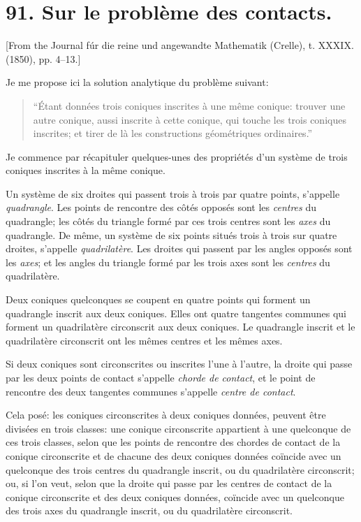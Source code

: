 \documentclass[12pt,a4paper]{article}
\theoremstyle{definition}
\begin{document}
\newpage


\section*{91. Sur le probl\`{e}me des contacts.}

[From the Journal f\'{u}r die reine und angewandte Mathematik (Crelle), t. XXXIX. (1850), pp. 4--13.]

Je me propose ici la solution analytique du probl\`{e}me suivant:
\begin{quote}
``\'{E}tant donn\'{e}es trois coniques inscrites \`{a} une m\^{e}me conique: trouver une autre conique, aussi inscrite \`{a} cette conique, qui touche les trois coniques inscrites; et tirer de l\`{a} les constructions g\'{e}om\'{e}triques ordinaires.''
\end{quote}

Je commence par r\'{e}capituler quelques-unes des propri\'{e}t\'{e}s d'un syst\`{e}me de trois coniques inscrites \`{a} la m\^{e}me conique.

Un syst\`{e}me de six droites qui passent trois \`{a} trois par quatre points, s'appelle \emph{quadrangle}. Les points de rencontre des c\^{o}t\'{e}s oppos\'{e}s sont les \emph{centres} du quadrangle; les c\^{o}t\'{e}s du triangle form\'{e} par ces trois centres sont les \emph{axes} du quadrangle. De m\^{e}me, un syst\`{e}me de six points situ\'{e}s trois \`{a} trois sur quatre droites, s'appelle \emph{quadrilat\`{e}re}. Les droites qui passent par les angles oppos\'{e}s sont les \emph{axes}; et les angles du triangle form\'{e} par les trois axes sont les \emph{centres} du quadrilat\`{e}re.

Deux coniques quelconques se coupent en quatre points qui forment un quadrangle inscrit aux deux coniques. Elles ont quatre tangentes communes qui forment un quadrilat\`{e}re circonscrit aux deux coniques. Le quadrangle inscrit et le quadrilat\`{e}re circonscrit ont les m\^{e}mes centres et les m\^{e}mes axes.

Si deux coniques sont circonscrites ou inscrites l'une \`{a} l'autre, la droite qui passe par les deux points de contact s'appelle \emph{chorde de contact}, et le point de rencontre des deux tangentes communes s'appelle \emph{centre de contact}.

Cela pos\'{e}: les coniques circonscrites \`{a} deux coniques donn\'{e}es, peuvent \^{e}tre divis\'{e}es en trois classes: une conique circonscrite appartient \`{a} une quelconque de ces trois classes, selon que les points de rencontre des chordes de contact de la conique circonscrite et de chacune des deux coniques donn\'{e}es co\"{i}ncide avec un quelconque des trois centres du quadrangle inscrit, ou du quadrilat\`{e}re circonscrit; ou, si l'on veut, selon que la droite qui passe par les centres de contact de la conique circonscrite et des deux coniques donn\'{e}es, co\"{i}ncide avec un quelconque des trois axes du quadrangle inscrit, ou du quadrilat\`{e}re circonscrit.
\end{document}

